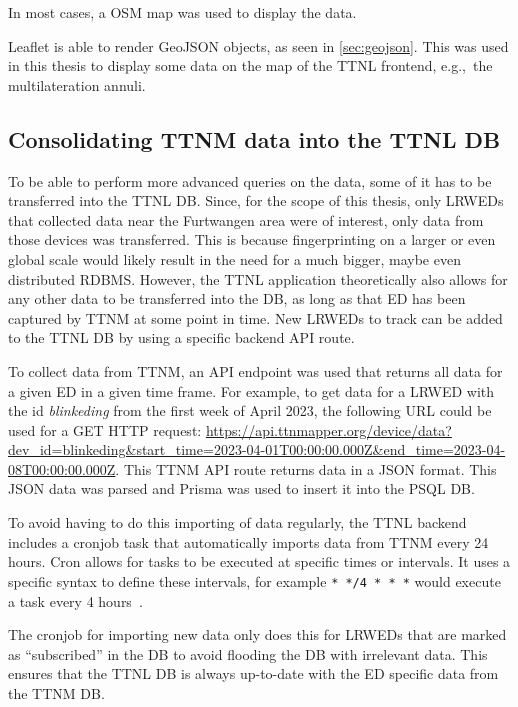 In most cases, a \ac{OSM} map was used to display the data.

Leaflet is able to render GeoJSON objects, as seen in \cref{sec:geojson}.
This was used in this thesis to display some data on the map of the \ac{TTNL} frontend, e.g.,\ the multilateration annuli.

\subsection{Consolidating \acl{TTNM} data into the \acl{TTNL} \acl{DB}}\label{sec:consolidating-ttnm-data-into-ttnl-db}

To be able to perform more advanced queries on the data, some of it has to be transferred into the \ac{TTNL} \acl{DB}.
Since, for the scope of this thesis, only \aclp{LRWED} that collected data near the Furtwangen area were of interest, only data from those devices was transferred.
This is because fingerprinting on a larger or even global scale would likely result in the need for a much bigger, maybe even distributed \ac{RDBMS}.
However, the \ac{TTNL} application theoretically also allows for any other data to be transferred into the \ac{DB}, as long as that \acl{ED} has been captured by \ac{TTNM} at some point in time.
New \aclp{LRWED} to track can be added to the \ac{TTNL} \ac{DB} by using a specific backend \ac{API} route.

To collect data from \ac{TTNM}, an \ac{API} endpoint was used that returns all data for a given \acl{ED} in a given time frame.
For example, to get data for a \acl{LRWED} with the id \emph{blinkeding} from the first week of April 2023, the following \ac{URL} could be used for a GET \ac{HTTP} request: \url{https://api.ttnmapper.org/device/data?dev_id=blinkeding&start_time=2023-04-01T00:00:00.000Z&end_time=2023-04-08T00:00:00.000Z}.
This \ac{TTNM} \ac{API} route returns data in a \ac{JSON} format.
This \ac{JSON} data was parsed and Prisma was used to insert it into the \ac{PSQL} \ac{DB}.

To avoid having to do this importing of data regularly, the \ac{TTNL} backend includes a cronjob task that automatically imports data from \ac{TTNM} every 24 hours.
Cron allows for tasks to be executed at specific times or intervals.
It uses a specific syntax to define these intervals, for example \texttt{* */4 * * *} would execute a task every 4 hours~\cite{drake_how_2020}.

The cronjob for importing new data only does this for \aclp{LRWED} that are marked as ``subscribed'' in the \ac{DB} to avoid flooding the \ac{DB} with irrelevant data.
This ensures that the \ac{TTNL} \ac{DB} is always up-to-date with the \acl{ED} specific data from the \ac{TTNM} \ac{DB}.

